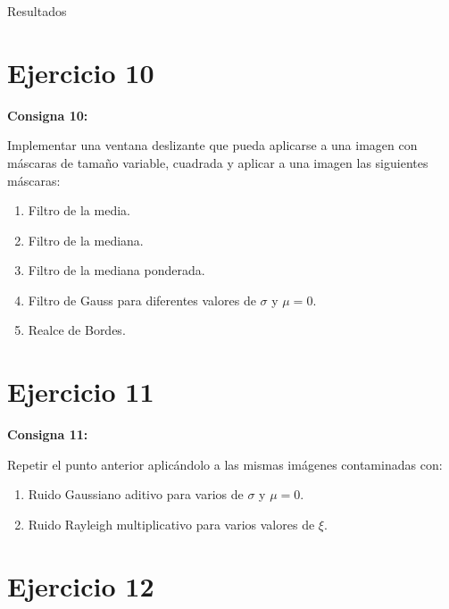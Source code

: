 \documentclass{beamer}
\begin{document}
\begin{frame}[fragile]{Resultados}
\begin{minipage}{0.45\linewidth}
		\label{fig:lenaej9}
	\end{minipage}
\end{frame}

\section{Ejercicio 10}

\begin{frame}
	\begin{center}
		\textcolor{unahurverde}{\textbf{Consigna 10:}}
	\end{center}
	\justifying
	
	Implementar una ventana deslizante que pueda aplicarse a una imagen con máscaras de
	tamaño variable, cuadrada y aplicar a una imagen las siguientes máscaras:

	\begin{enumerate}
		\item Filtro de la media.
		\item Filtro de la mediana.
		\item Filtro de la mediana ponderada.
		\item Filtro de Gauss para diferentes valores de $\sigma$ y $\mu = 0$.
		\item Realce de Bordes.
	\end{enumerate}
\end{frame}

\section{Ejercicio 11}

\begin{frame}
	\begin{center}
		\textcolor{unahurverde}{\textbf{Consigna 11:}}
	\end{center}
	\justifying
	
	Repetir el punto anterior aplicándolo a las mismas imágenes contaminadas con:
	
	\begin{enumerate}
		\item Ruido Gaussiano aditivo para varios de $\sigma$ y $\mu = 0$.
		\item Ruido Rayleigh multiplicativo para varios valores de $\xi$. 
	\end{enumerate}
\end{frame}

\section{Ejercicio 12}
\end{document}
